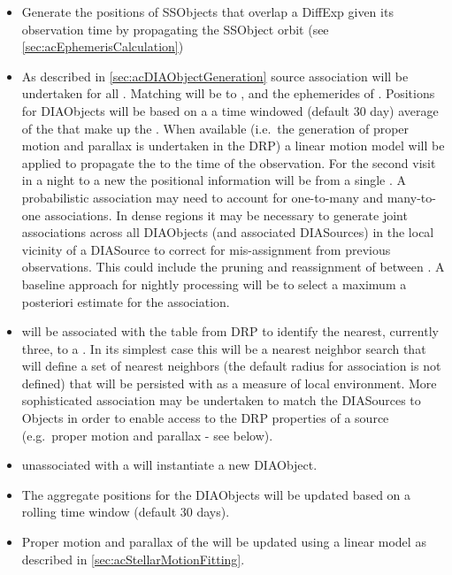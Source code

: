 \begin{itemize}
\item Generate the positions of SSObjects that overlap a DiffExp given its observation time by propagating the SSObject orbit (see \ref{sec:acEphemerisCalculation}) 
\item As described in \ref{sec:acDIAObjectGeneration} source association will be undertaken for all \DIASources. Matching will be to \DIAObjects, and the ephemerides of \SSObjects. Positions for DIAObjects will be based on a a time windowed (default 30 day) average of the \DIASources that make up the \DIAObject. When available (i.e.\ the generation of proper motion and parallax is undertaken in the DRP) a linear motion model will be applied to propagate the \DIAObject to the time of the observation. For the second visit in a night to a new \DIAObject the positional information will be from a single \DIASource. A probabilistic association may need to account for one-to-many and many-to-one associations. In dense regions it may be necessary to generate joint associations across all DIAObjects (and associated DIASources) in the local  vicinity of a DIASource to correct for mis-assignment from previous observations. This could include the pruning and reassignment of \DIASources between \DIAObjects. A baseline approach for nightly processing will be to select a maximum a posteriori estimate for the association.
\item \DIASources will be associated with the \Object table from DRP to identify the nearest, currently three, \Objects to a \DIASource. In its simplest case this will be a nearest neighbor search that will define a set of nearest neighbors (the default radius for association is not defined) that will be persisted with \DIAObjects as a measure of local environment. More sophisticated association may be undertaken to match the DIASources to Objects in order to enable access to the DRP properties of a source (e.g.\ proper motion and parallax - see below).
\item \DIASources unassociated with a \DIAObject will instantiate a new DIAObject.
\item The aggregate positions for the DIAObjects will be updated based on a rolling time window (default 30 days). 
\item Proper motion and parallax of the \DIAObject will be updated using a linear model as described in \ref{sec:acStellarMotionFitting}. 
\end{itemize}


